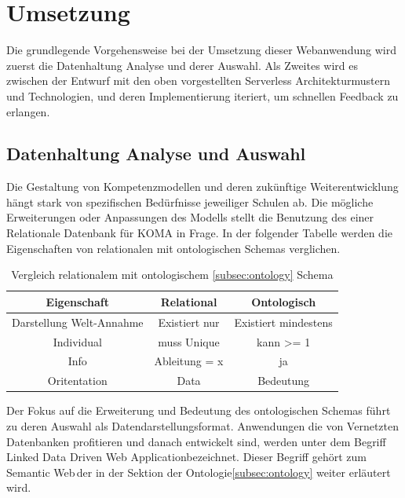 \documentclass[
12pt,
english,
ngerman,
headsepline,
twoside,
openright,
numbers=noenddot,version=first
]{scrreprt}
\providecommand{\tabularnewline}{\\}
\begin{document}
\section{Umsetzung}
\label{chap:impl}
Die grundlegende Vorgehensweise bei der Umsetzung dieser Webanwendung wird zuerst die Datenhaltung Analyse und derer Auswahl. Als Zweites wird es zwischen der Entwurf mit den oben vorgestellten Serverless Architekturmustern und Technologien, und deren Implementierung iteriert, um schnellen Feedback zu erlangen.

\subsection{Datenhaltung Analyse und Auswahl}
Die Gestaltung von Kompetenzmodellen und deren zukünftige Weiterentwicklung hängt stark von spezifischen Bedürfnisse jeweiliger Schulen ab. Die mögliche Erweiterungen oder Anpassungen des Modells stellt die Benutzung des einer Relationale Datenbank für \acrshort{KOMA} in Frage. In der folgender Tabelle werden die Eigenschaften von relationalen mit ontologischen Schemas verglichen.

\begin{table}[h]
	\caption{Vergleich relationalem mit ontologischem \ref{subsec:ontology} Schema}
	\centering{}
	\begin{tabular}{ccc}
		\noalign{\vskip\doublerulesep}
		Eigenschaft & Relational & Ontologisch \tabularnewline[\doublerulesep]
		\hline\noalign{\vskip\doublerulesep}
		Darstellung Welt-Annahme & Existiert nur & Existiert mindestens \tabularnewline[\doublerulesep]
		\noalign{\vskip\doublerulesep}
		Individual & muss Unique & kann >= 1 \tabularnewline[\doublerulesep]
		\noalign{\vskip\doublerulesep}
		Info & Ableitung = x & ja \tabularnewline[\doublerulesep]
		\noalign{\vskip\doublerulesep}
		Oritentation & Data & Bedeutung \tabularnewline[\doublerulesep]
		
	\end{tabular}
\end{table}

Der Fokus auf die Erweiterung und Bedeutung des ontologischen Schemas führt zu deren Auswahl als Datendarstellungsformat. 
Anwendungen die von Vernetzten Datenbanken profitieren und danach entwickelt sind, werden unter dem Begriff \glqq Linked Data Driven Web Application\grqq bezeichnet\cite{W3C}. 
Dieser Begriff gehört zum \glqq Semantic Web\grqq\,der in der Sektion der Ontologie\ref{subsec:ontology} weiter erläutert wird.
\end{document}
